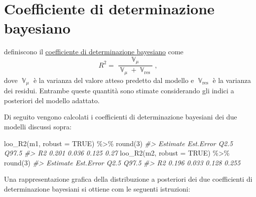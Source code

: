 \documentclass[
  10pt,
  italian,
  a4paper,
  extrafontsizes,onecolumn,openright
  ]{memoir}
\newenvironment{Shaded}{\begin{snugshade}}{\end{snugshade}}
\newcommand{\AttributeTok}[1]{\textcolor[rgb]{0.77,0.63,0.00}{#1}}
\newcommand{\CommentTok}[1]{\textcolor[rgb]{0.56,0.35,0.01}{\textit{#1}}}
\newcommand{\ConstantTok}[1]{\textcolor[rgb]{0.00,0.00,0.00}{#1}}
\newcommand{\DecValTok}[1]{\textcolor[rgb]{0.00,0.00,0.81}{#1}}
\newcommand{\FunctionTok}[1]{\textcolor[rgb]{0.00,0.00,0.00}{#1}}
\newcommand{\NormalTok}[1]{#1}
\newcommand{\SpecialCharTok}[1]{\textcolor[rgb]{0.00,0.00,0.00}{#1}}
\DeclareMathOperator{\Var}{\mathbb{V}} %
\theoremstyle{definition}
\theoremstyle{definition}
\theoremstyle{definition}
\theoremstyle{definition}
\theoremstyle{remark}
\begin{document}
\hypertarget{coefficiente-di-determinazione-bayesiano}{%
\section{Coefficiente di determinazione bayesiano}\label{coefficiente-di-determinazione-bayesiano}}

\textcite{gelman2019r} definiscono il \href{https://avehtari.github.io/bayes_R2/bayes_R2.html}{coefficiente di determinazione bayesiano} come
\begin{equation}
R^2 = \frac{\Var_{\mu}}{\Var_{\mu} + \Var_{\text{res}}},
\end{equation}
dove \(\Var_{\mu}\) è la varianza del valore atteso predetto dal modello e \(\Var_{\text{res}}\) è la varianza dei residui. Entrambe queste quantità sono stimate considerando gli indici a posteriori del modello adattato.

Di seguito vengono calcolati i coefficienti di determinazione bayesiani dei due modelli discussi sopra:

\begin{Shaded}
\begin{Highlighting}[]
\FunctionTok{loo\_R2}\NormalTok{(m1, }\AttributeTok{robust =} \ConstantTok{TRUE}\NormalTok{) }\SpecialCharTok{\%\textgreater{}\%}
  \FunctionTok{round}\NormalTok{(}\DecValTok{3}\NormalTok{)}
\CommentTok{\#\textgreater{}    Estimate Est.Error  Q2.5 Q97.5}
\CommentTok{\#\textgreater{} R2    0.201     0.036 0.125  0.27}
\FunctionTok{loo\_R2}\NormalTok{(m2, }\AttributeTok{robust =} \ConstantTok{TRUE}\NormalTok{) }\SpecialCharTok{\%\textgreater{}\%}
  \FunctionTok{round}\NormalTok{(}\DecValTok{3}\NormalTok{)}
\CommentTok{\#\textgreater{}    Estimate Est.Error  Q2.5 Q97.5}
\CommentTok{\#\textgreater{} R2    0.196     0.033 0.128 0.255}
\end{Highlighting}
\end{Shaded}

\noindent
Una rappresentazione grafica della distribuzione a posteriori dei due coefficienti di determinazione bayesiani si ottiene com le seguenti istruzioni:
\end{document}
